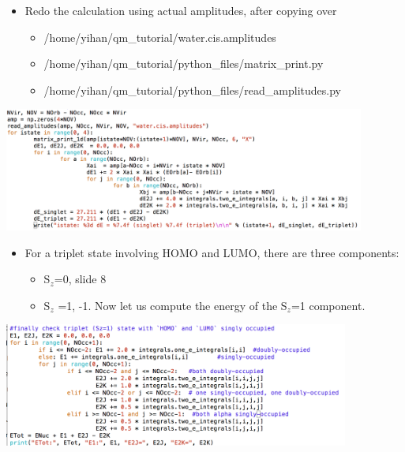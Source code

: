 \documentclass{beamer} %
\begin{document}
\begin{frame}
\begin{itemize}
\item Redo the calculation using actual amplitudes, after copying over
\begin{itemize}
\item /home/yihan/qm\_tutorial/water.cis.amplitudes
\item  /home/yihan/qm\_tutorial/python\_files/matrix\_print.py
\item  /home/yihan/qm\_tutorial/python\_files/read\_amplitudes.py
\end{itemize}
\end{itemize}
\begin{center}
\includegraphics[height=1.6in]{figures/cis-code-2.png}
\end{center}
\end{frame}

\begin{frame}
\begin{itemize}
\item \footnotesize{For a triplet state involving HOMO and LUMO, there are three components:}
\begin{itemize}
\item \footnotesize{S$_z$=0, slide 8} 
\item \footnotesize{S$_z$ =1, -1.   Now let us compute the energy of the S$_z$=1 component.  }
\end{itemize}
\end{itemize}
\begin{center}
\includegraphics[height=1.6in]{figures/rohf-code.png}
\end{center}
\end{frame}
\end{document}
